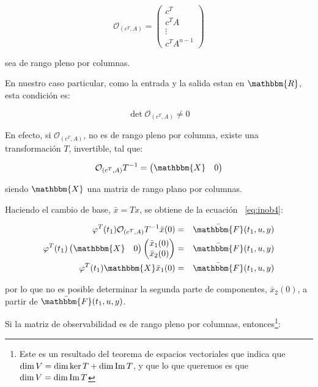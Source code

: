		\begin{equation}
			\mathcal{O}_{(c^T, A)} =
			\begin{pmatrix}
				c^T \\
				c^T A \\
				\vdots \\
				c^T A^{n-1}
			\end{pmatrix}
		\end{equation}

		sea de rango pleno por columnas.

		En nuestro caso particular, como la entrada y la salida estan en $\mathbbm{R}$, esta condición es:

		\begin{equation*}
			\det{\mathcal{O}_{(c^T, A)}} \ne 0
		\end{equation*}

		En efecto, si $\mathcal{O}_{(c^T, A)}$, no es de rango pleno por columna, existe una transformación $T$, invertible, tal que:

		\begin{equation*}
			\mathcal{O}_{(c^T, A)} T^{-1} =
			\begin{pmatrix}
				\mathbbm{X} & 0
			\end{pmatrix}
		\end{equation*}

		siendo $\mathbbm{X}$ una matriz de rango plano por columnas.

		Haciendo el cambio de base, $\bar{x} = T x$, se obtiene de la ecuación ~\ref{eq:inob4}:

		\begin{eqnarray*}
			\varphi^T(t_1) \mathcal{O}_{(c^T, A)} T^{-1} \bar{x}(0) & = & \bar{\mathbbm{F}}(t_1, u, y) \\
			\varphi^T(t_1)
			\begin{pmatrix}
			 	\mathbbm{X} & 0
			\end{pmatrix}
			\begin{pmatrix}
			 	\bar{x}_1(0) \\
			 	\bar{x}_2(0)
			\end{pmatrix} & = & \bar{\mathbbm{F}}(t_1, u, y) \\
			\varphi^T(t_1) \mathbbm{X} \bar{x}_1(0) & = & \bar{\mathbbm{F}}(t_1, u, y)
		\end{eqnarray*}

		por lo que no es posible determinar la segunda parte de componentes, $\bar{x}_2(0)$, a partir de $\bar{\mathbbm{F}}(t_1, u, y)$.

		Si la matriz de observabilidad es de rango pleno por columnas, entonces\footnote{Este es un resultado del teorema de espacios vectoriales que indica que $\dim{V} = \dim{\ker{T}} + \dim{\operatorname{Im}{T}}$, y que lo que queremos es que $\dim{V} = \dim{\operatorname{Im}{T}}$}:

